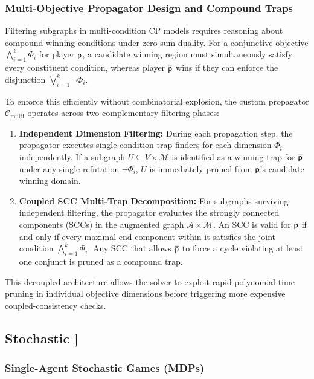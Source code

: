 \documentclass{article}
\begin{document}
\subsubsection{Multi-Objective Propagator Design and Compound Traps}
Filtering subgraphs in multi-condition CP models requires reasoning about compound winning conditions under zero-sum duality. For a conjunctive objective $\bigwedge_{i=1}^k \Phi_i$ for player $\mathsf{p}$, a candidate winning region must simultaneously satisfy every constituent condition, whereas player $\overline{\mathsf{p}}$ wins if they can enforce the disjunction $\bigvee_{i=1}^k \neg \Phi_i$.

To enforce this efficiently without combinatorial explosion, the custom propagator $\mathcal{C}_{\text{multi}}$ operates across two complementary filtering phases:
\begin{enumerate}
    \item \textbf{Independent Dimension Filtering:} During each propagation step, the propagator executes single-condition trap finders for each dimension $\Phi_i$ independently. If a subgraph $U \subseteq V \times \mathcal{M}$ is identified as a winning trap for $\overline{\mathsf{p}}$ under any single refutation $\neg \Phi_i$, $U$ is immediately pruned from $\mathsf{p}$'s candidate winning domain.
    \item \textbf{Coupled SCC Multi-Trap Decomposition:} For subgraphs surviving independent filtering, the propagator evaluates the strongly connected components (SCCs) in the augmented graph $\mathcal{A} \times \mathcal{M}$. An SCC is valid for $\mathsf{p}$ if and only if every maximal end component within it satisfies the joint condition $\bigwedge_{i=1}^k \Phi_i$. Any SCC that allows $\overline{\mathsf{p}}$ to force a cycle violating at least one conjunct is pruned as a compound trap.
\end{enumerate}
This decoupled architecture allows the solver to exploit rapid polynomial-time pruning in individual objective dimensions before triggering more expensive coupled-consistency checks.


\subsection{Stochastic \wregulargames [\hyperref[sec:rq]{RQ4}]}

\subsubsection{Single-Agent Stochastic Games (MDPs)}
\end{document}
